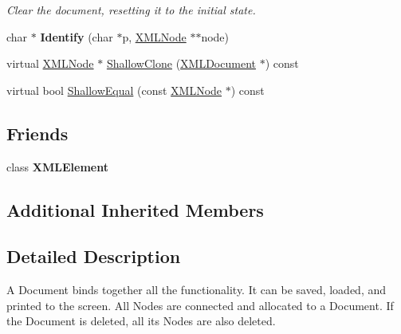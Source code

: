 \begin{DoxyCompactItemize}
\begin{DoxyCompactList}\small\item\em Clear the document, resetting it to the initial state. \end{DoxyCompactList}\item 
\hypertarget{classtinyxml2_1_1_x_m_l_document_a25827d1bec509ad566a107e5853ed040}{char $\ast$ {\bfseries Identify} (char $\ast$p, \hyperlink{classtinyxml2_1_1_x_m_l_node}{X\+M\+L\+Node} $\ast$$\ast$node)}\label{classtinyxml2_1_1_x_m_l_document_a25827d1bec509ad566a107e5853ed040}

\item 
virtual \hyperlink{classtinyxml2_1_1_x_m_l_node}{X\+M\+L\+Node} $\ast$ \hyperlink{classtinyxml2_1_1_x_m_l_document_a57c8511ed9f83aa3e20909a3db3f83d0}{Shallow\+Clone} (\hyperlink{classtinyxml2_1_1_x_m_l_document}{X\+M\+L\+Document} $\ast$) const 
\item 
virtual bool \hyperlink{classtinyxml2_1_1_x_m_l_document_a12eac66c6e45d074d5cc47319868cd66}{Shallow\+Equal} (const \hyperlink{classtinyxml2_1_1_x_m_l_node}{X\+M\+L\+Node} $\ast$) const 
\end{DoxyCompactItemize}
\subsection*{Friends}
\begin{DoxyCompactItemize}
\item 
\hypertarget{classtinyxml2_1_1_x_m_l_document_ac2fba9b6e452829dd892f7392c24e0eb}{class {\bfseries X\+M\+L\+Element}}\label{classtinyxml2_1_1_x_m_l_document_ac2fba9b6e452829dd892f7392c24e0eb}

\end{DoxyCompactItemize}
\subsection*{Additional Inherited Members}


\subsection{Detailed Description}
A Document binds together all the functionality. It can be saved, loaded, and printed to the screen. All Nodes are connected and allocated to a Document. If the Document is deleted, all its Nodes are also deleted. 

